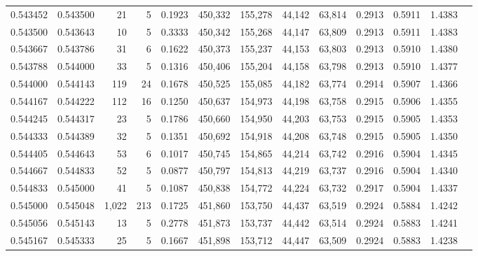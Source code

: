 \begin{tabular}{rrrrrrrrrrrrr}
0.543452 & 0.543500 &    21 &   5 &                                     0.1923 & 450,332 & 155,278 &  44,142 &  63,814 & 0.2913 & 0.5911 & 1.4383 \\
0.543500 & 0.543643 &    10 &   5 &                                     0.3333 & 450,342 & 155,268 &  44,147 &  63,809 & 0.2913 & 0.5911 & 1.4383 \\
0.543667 & 0.543786 &    31 &   6 &                                     0.1622 & 450,373 & 155,237 &  44,153 &  63,803 & 0.2913 & 0.5910 & 1.4380 \\
0.543788 & 0.544000 &    33 &   5 &                                     0.1316 & 450,406 & 155,204 &  44,158 &  63,798 & 0.2913 & 0.5910 & 1.4377 \\
0.544000 & 0.544143 &   119 &  24 &                                     0.1678 & 450,525 & 155,085 &  44,182 &  63,774 & 0.2914 & 0.5907 & 1.4366 \\
0.544167 & 0.544222 &   112 &  16 &                                     0.1250 & 450,637 & 154,973 &  44,198 &  63,758 & 0.2915 & 0.5906 & 1.4355 \\
0.544245 & 0.544317 &    23 &   5 &                                     0.1786 & 450,660 & 154,950 &  44,203 &  63,753 & 0.2915 & 0.5905 & 1.4353 \\
0.544333 & 0.544389 &    32 &   5 &                                     0.1351 & 450,692 & 154,918 &  44,208 &  63,748 & 0.2915 & 0.5905 & 1.4350 \\
0.544405 & 0.544643 &    53 &   6 &                                     0.1017 & 450,745 & 154,865 &  44,214 &  63,742 & 0.2916 & 0.5904 & 1.4345 \\
0.544667 & 0.544833 &    52 &   5 &                                     0.0877 & 450,797 & 154,813 &  44,219 &  63,737 & 0.2916 & 0.5904 & 1.4340 \\
0.544833 & 0.545000 &    41 &   5 &                                     0.1087 & 450,838 & 154,772 &  44,224 &  63,732 & 0.2917 & 0.5904 & 1.4337 \\
0.545000 & 0.545048 & 1,022 & 213 &                                     0.1725 & 451,860 & 153,750 &  44,437 &  63,519 & 0.2924 & 0.5884 & 1.4242 \\
0.545056 & 0.545143 &    13 &   5 &                                     0.2778 & 451,873 & 153,737 &  44,442 &  63,514 & 0.2924 & 0.5883 & 1.4241 \\
0.545167 & 0.545333 &    25 &   5 &                                     0.1667 & 451,898 & 153,712 &  44,447 &  63,509 & 0.2924 & 0.5883 & 1.4238 \\

\end{tabular}
